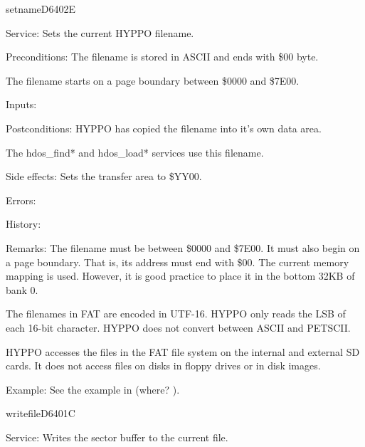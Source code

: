 %
\newpage
\begin{hyppotrap}{setname}{D640}{2E}
\item [Service:]
  Sets the current HYPPO filename.
\item [Preconditions:]
  The filename is stored in ASCII and ends with \$00 byte.

  The filename starts on a page boundary between \$0000 and \$7E00.
\item [Inputs:]
\item [Postconditions:]
  HYPPO has copied the filename into it's own data area.

  The hdos\_find* and hdos\_load* services use this filename.
\item [Side effects:]
  Sets the transfer area to \$YY00.
\item [Errors:]
\item [History:]
\item [Remarks:]
  The filename must be between \$0000 and \$7E00. It must also begin on a
  page boundary. That is, its address must end with \$00. The current memory
  mapping is used. However, it is good practice to place it in the bottom 32KB
  of bank 0.

  The filenames in FAT are encoded in UTF-16. HYPPO only reads the LSB
  of each 16-bit character. HYPPO does not convert between ASCII and
  PETSCII.

  HYPPO accesses the files in the FAT file system on the internal and
  external SD cards. It does not access files on disks in floppy drives or in
  disk images.
\item [Example:]
  See the example in (where? \TODO).
\end{hyppotrap}


\newpage
\begin{hyppotrap}{writefile}{D640}{1C}
\item [Service:]
  Writes the sector buffer to the current file.
\notimplemented
\end{hyppotrap}



